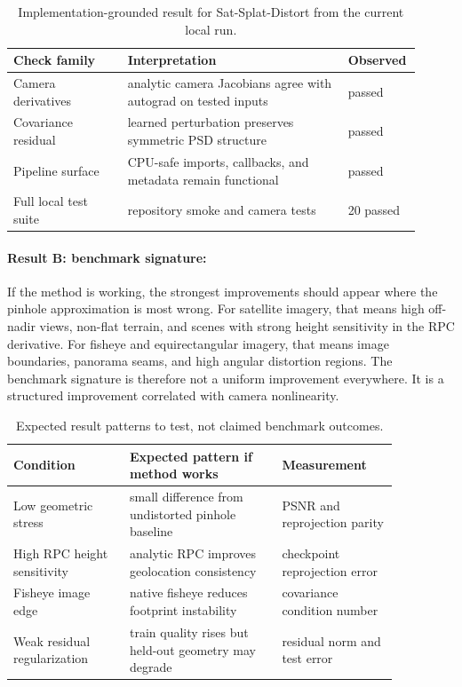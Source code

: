 \documentclass{article}
\begin{document}
\begin{table}[t]
\centering
\caption{Implementation-grounded result for Sat-Splat-Distort from the current local run.}
\begin{tabular}{@{}p{0.27\linewidth}p{0.52\linewidth}p{0.12\linewidth}@{}}
\toprule
\textbf{Check family} & \textbf{Interpretation} & \textbf{Observed}\\
\midrule
Camera derivatives & analytic camera Jacobians agree with autograd on tested inputs & passed\\
Covariance residual & learned perturbation preserves symmetric PSD structure & passed\\
Pipeline surface & CPU-safe imports, callbacks, and metadata remain functional & passed\\
Full local test suite & repository smoke and camera tests & 20 passed\\
\bottomrule
\end{tabular}
\end{table}

\paragraph{Result B: benchmark signature:}

If the method is working, the strongest improvements should appear where the pinhole approximation is most wrong. For satellite imagery, that means high off-nadir views, non-flat terrain, and scenes with strong height sensitivity in the RPC derivative. For fisheye and equirectangular imagery, that means image boundaries, panorama seams, and high angular distortion regions. The benchmark signature is therefore not a uniform improvement everywhere. It is a structured improvement correlated with camera nonlinearity.

\begin{table}[t]
\centering
\caption{Expected result patterns to test, not claimed benchmark outcomes.}
\begin{tabular}{@{}p{0.26\linewidth}p{0.34\linewidth}p{0.26\linewidth}@{}}
\toprule
\textbf{Condition} & \textbf{Expected pattern if method works} & \textbf{Measurement}\\
\midrule
Low geometric stress & small difference from undistorted pinhole baseline & PSNR and reprojection parity\\
High RPC height sensitivity & analytic RPC improves geolocation consistency & checkpoint reprojection error\\
Fisheye image edge & native fisheye reduces footprint instability & covariance condition number\\
Weak residual regularization & train quality rises but held-out geometry may degrade & residual norm and test error\\
\bottomrule
\end{tabular}
\end{table}
\end{document}
